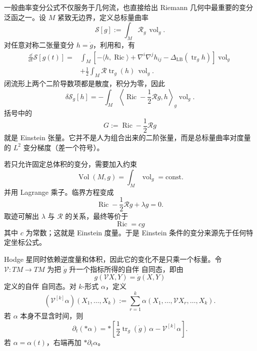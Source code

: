 一般曲率变分公式不仅服务于几何流，也直接给出 Riemann 几何中最重要的变分泛函之一。设 $M$ 紧致无边界，定义总标量曲率
\[
\mathcal S[g]
:=\int_M\mathcal R_g\,\operatorname{vol}_g.
\]
对任意对称二张量变分 $h=\dot g$，利用和，有
\[
\begin{aligned}
\frac{\dd}{\dd t}\mathcal S[g(t)]
={}&\int_M
\left[
-\langle h,\operatorname{Ric}\rangle
+\nabla^i\nabla^jh_{ij}
-\Delta_{\mathrm{LB}}(\operatorname{tr}_gh)
\right]\operatorname{vol}_g\\
&+\frac12\int_M
\mathcal R\operatorname{tr}_g(h)\,\operatorname{vol}_g.
\end{aligned}
\]
闭流形上两个二阶导数项都是散度，积分为零，因此
\begin{equation*}\boxed{
\delta\mathcal S_g[h]
=-\int_M
\left\langle
\operatorname{Ric}-\frac12\mathcal R g,
h
\right\rangle_g\operatorname{vol}_g
}.\end{equation*}
括号中的
\[
G:=\operatorname{Ric}-\frac12\mathcal R g
\]
就是 Einstein 张量。它并不是人为组合出来的二阶张量，而是总标量曲率对度量的 $L^2$ 变分梯度（差一个符号）。

若只允许固定总体积的变分，需要加入约束
\[
\operatorname{Vol}(M,g)
=\int_M\operatorname{vol}_g=\text{const.}
\]
并用 Lagrange 乘子。临界方程变成
\[
\operatorname{Ric}-\frac12\mathcal R g
+\lambda g=0.
\]
取迹可解出 $\lambda$ 与 $\mathcal R$ 的关系，最终等价于
\begin{equation*}\boxed{
\operatorname{Ric}=cg
}\end{equation*}
其中 $c$ 为常数；这就是 Einstein 度量。于是 Einstein 条件的变分来源先于任何特定坐标公式。

Hodge 星同时依赖逆度量和体积，因此它的变化不是只乘一个标量。令 $\mathcal V:TM\to TM$ 为把 $\dot g$ 升一个指标所得的自伴 自同态，即由
\begin{equation*}g(\mathcal V X,Y)=\dot g(X,Y)
\end{equation*}
定义的自伴 自同态。对 $k$-形式 $\alpha$，定义
\[
(\mathcal V^{[k]}\alpha)(X_1,\ldots,X_k)
:=\sum_{r=1}^k
\alpha(X_1,\ldots,\mathcal V X_r,\ldots,X_k).
\]
若 $\alpha$ 本身不显含时间，则
\begin{equation}\label{eq:math-dg-hodge-star-variation}
\boxed{
\partial_t(*\alpha)
=*
\left[
\frac12\operatorname{tr}_g(\dot g)\,\alpha
-\mathcal V^{[k]}\alpha
\right].}
\end{equation}
若 $\alpha=\alpha(t)$，右端再加 $*\partial_t\alpha$。



